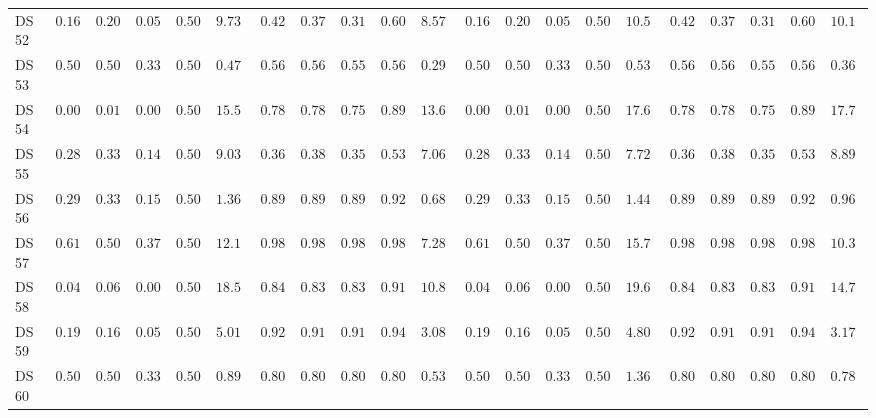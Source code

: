 {\begin{longtable}{|l|ccccc|ccccc|ccccc|ccccc|}
		DS 52 & $0.1689$ & $0.2000$ & $0.0578$ & $0.5000$ & $9.7337$ & $0.4222$ & $0.3752$ & $0.3151$ & $0.6095$ & $\boldsymbol{8.5753}$ & $0.1689$ & $0.2000$ & $0.0578$ & $0.5000$ & $10.5008$ & $0.4222$ & $0.3752$ & $0.3151$ & $0.6095$ & $10.1390$ \\
		DS 53 & $0.5000$ & $0.5000$ & $0.3333$ & $0.5000$ & $0.4716$ & $0.5600$ & $0.5600$ & $0.5593$ & $0.5600$ & $\boldsymbol{0.2955}$ & $0.5000$ & $0.5000$ & $0.3333$ & $0.5000$ & $0.5300$ & $0.5600$ & $0.5600$ & $0.5593$ & $0.5600$ & $0.3637$ \\
		DS 54 & $0.0033$ & $0.0167$ & $0.0001$ & $0.5000$ & $15.5391$ & $0.7833$ & $0.7874$ & $0.7542$ & $0.8919$ & $\boldsymbol{13.6398}$ & $0.0033$ & $0.0167$ & $0.0001$ & $0.5000$ & $17.6962$ & $0.7833$ & $0.7874$ & $0.7542$ & $0.8919$ & $17.7312$ \\
		DS 55 & $0.2872$ & $0.3333$ & $0.1488$ & $0.5000$ & $9.0323$ & $0.3670$ & $0.3819$ & $0.3515$ & $0.5364$ & $\boldsymbol{7.0614}$ & $0.2872$ & $0.3333$ & $0.1488$ & $0.5000$ & $7.7259$ & $0.3670$ & $0.3819$ & $0.3515$ & $0.5364$ & $8.8978$ \\
		DS 56 & $0.2933$ & $0.3333$ & $0.1512$ & $0.5000$ & $1.3605$ & $0.8933$ & $0.8947$ & $0.8922$ & $0.9210$ & $\boldsymbol{0.6807}$ & $0.2933$ & $0.3333$ & $0.1512$ & $0.5000$ & $1.4448$ & $0.8933$ & $0.8947$ & $0.8922$ & $0.9210$ & $0.9636$ \\
		DS 57 & $0.6122$ & $0.5000$ & $0.3797$ & $0.5000$ & $12.1211$ & $0.9837$ & $0.9828$ & $0.9828$ & $0.9828$ & $\boldsymbol{7.2803}$ & $0.6122$ & $0.5000$ & $0.3797$ & $0.5000$ & $15.7116$ & $\boldsymbol{0.9837}$ & $\boldsymbol{0.9828}$ & $\boldsymbol{0.9828}$ & $\boldsymbol{0.9828}$ & $10.3506$ \\
		DS 58 & $0.0426$ & $0.0667$ & $0.0054$ & $0.5000$ & $18.5349$ & $0.8475$ & $0.8391$ & $0.8371$ & $0.9138$ & $\boldsymbol{10.8002}$ & $0.0426$ & $0.0667$ & $0.0054$ & $0.5000$ & $19.6720$ & $\boldsymbol{0.8475}$ & $\boldsymbol{0.8391}$ & $\boldsymbol{0.8371}$ & $\boldsymbol{0.9138}$ & $14.7631$ \\
		DS 59 & $0.1933$ & $0.1667$ & $0.0540$ & $0.5000$ & $5.0144$ & $0.9267$ & $0.9123$ & $0.9126$ & $0.9474$ & $\boldsymbol{3.0844}$ & $0.1933$ & $0.1667$ & $0.0540$ & $0.5000$ & $4.8065$ & $0.9267$ & $0.9123$ & $0.9126$ & $0.9474$ & $3.1793$ \\
		DS 60 & $0.5075$ & $0.5000$ & $0.3366$ & $0.5000$ & $0.8955$ & $0.8060$ & $0.8044$ & $0.8032$ & $0.8044$ & $\boldsymbol{0.5377}$ & $0.5075$ & $0.5000$ & $0.3366$ & $0.5000$ & $1.3663$ & $0.8060$ & $0.8044$ & $0.8032$ & $0.8044$ & $0.7830$ \\

\end{longtable}}
